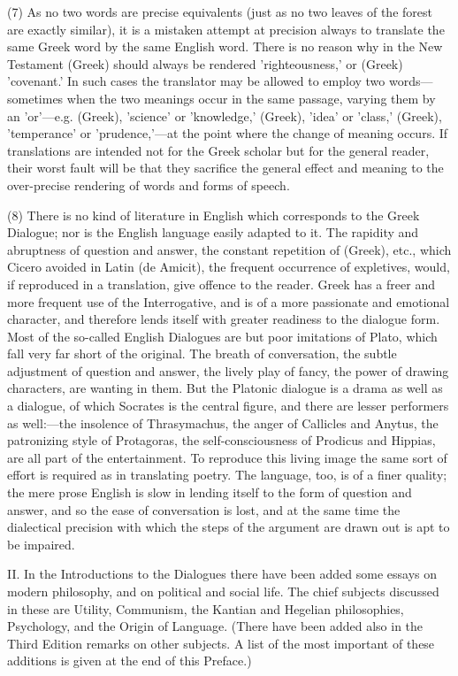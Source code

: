 \documentclass[11pt,letter]{article}
\begin{document}
\par  (7) As no two words are precise equivalents (just as no two leaves of the forest are exactly similar), it is a mistaken attempt at precision always to translate the same Greek word by the same English word. There is no reason why in the New Testament (Greek) should always be rendered 'righteousness,' or (Greek) 'covenant.' In such cases the translator may be allowed to employ two words—sometimes when the two meanings occur in the same passage, varying them by an 'or'—e.g. (Greek), 'science' or 'knowledge,' (Greek), 'idea' or 'class,' (Greek), 'temperance' or 'prudence,'—at the point where the change of meaning occurs. If translations are intended not for the Greek scholar but for the general reader, their worst fault will be that they sacrifice the general effect and meaning to the over-precise rendering of words and forms of speech.

\par  (8) There is no kind of literature in English which corresponds to the Greek Dialogue; nor is the English language easily adapted to it. The rapidity and abruptness of question and answer, the constant repetition of (Greek), etc., which Cicero avoided in Latin (de Amicit), the frequent occurrence of expletives, would, if reproduced in a translation, give offence to the reader. Greek has a freer and more frequent use of the Interrogative, and is of a more passionate and emotional character, and therefore lends itself with greater readiness to the dialogue form. Most of the so-called English Dialogues are but poor imitations of Plato, which fall very far short of the original. The breath of conversation, the subtle adjustment of question and answer, the lively play of fancy, the power of drawing characters, are wanting in them. But the Platonic dialogue is a drama as well as a dialogue, of which Socrates is the central figure, and there are lesser performers as well:—the insolence of Thrasymachus, the anger of Callicles and Anytus, the patronizing style of Protagoras, the self-consciousness of Prodicus and Hippias, are all part of the entertainment. To reproduce this living image the same sort of effort is required as in translating poetry. The language, too, is of a finer quality; the mere prose English is slow in lending itself to the form of question and answer, and so the ease of conversation is lost, and at the same time the dialectical precision with which the steps of the argument are drawn out is apt to be impaired.

\par  II. In the Introductions to the Dialogues there have been added some essays on modern philosophy, and on political and social life. The chief subjects discussed in these are Utility, Communism, the Kantian and Hegelian philosophies, Psychology, and the Origin of Language. (There have been added also in the Third Edition remarks on other subjects. A list of the most important of these additions is given at the end of this Preface.)
\end{document}
